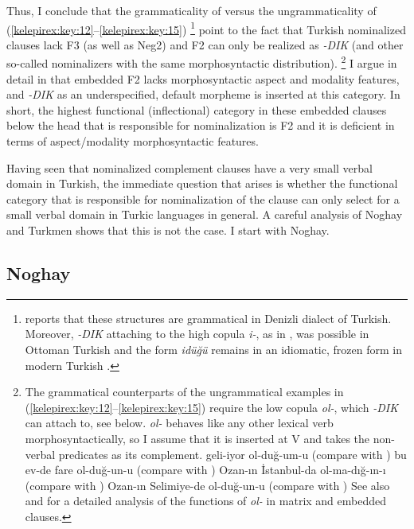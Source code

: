 \documentclass[output=paper]{langsci/langscibook}
\begin{document}
Thus, I conclude that the grammaticality of  versus the ungrammaticality of (\ref{kelepirex:key:12}--\ref{kelepirex:key:15})%
\footnote{%
    \citet{Sag2013} reports that these structures are grammatical in Denizli dialect of Turkish. 
    Moreover, \textit{-DIK} attaching to the high copula \textit{i-}, as in , 
    was possible in Ottoman Turkish \citep[195]{Kerslake1988} 
    and the form \textit{idüğü} remains in an idiomatic, frozen form in modern Turkish \citep{Banguoglu1990,Kelepir2013}.
} 
point to the fact that Turkish nominalized clauses lack F3 (as well as Neg2) and F2 can only be realized as \textit{-DIK} 
(and other so-called nominalizers with the same morphosyntactic distribution).%
\footnote{%
    The grammatical counterparts of the ungrammatical examples in (\ref{kelepirex:key:12}--\ref{kelepirex:key:15}) require the low copula \textit{ol-}, 
    which \textit{-DIK} can attach to, see  below. 
    \textit{ol-} behaves like any other lexical verb morphosyntactically, so I assume that it is inserted at V 
    and takes the non-verbal predicates as its complement.
    \ea
        \label{kelepirex:key:i:ftn11}
        \ea geli-iyor ol-duğ-um-u (compare with )  
        \ex bu ev-de fare ol-duğ-un-u (compare with )
        \ex Ozan-ın İstanbul-da ol-ma-dığ-ın-ı (compare with )
        \ex Ozan-ın Selimiye-de ol-duğ-un-u (compare with )
        \z 
    \z 
    See also \citet{Kerslake1988} and \citet{Goksel2001} for a detailed analysis of the functions of \textit{ol-} in matrix and embedded clauses.
} 
I argue in detail in \citet{Kelepir2013} that embedded F2 lacks morphosyntactic aspect and modality features, 
and \textit{-DIK} as an underspecified, default morpheme is inserted at this category. 
In short, the highest functional (inflectional) category in these embedded clauses below the head 
that is responsible for nominalization is F2 and it is deficient in terms of aspect/modality morphosyntactic features.

Having seen that nominalized complement clauses have a very small verbal domain in Turkish, 
the immediate question that arises is whether the functional category that is responsible for nominalization of the clause 
can only select for a small verbal domain in Turkic languages in general. 
A careful analysis of Noghay and Turkmen shows that this is not the case. 
I start with Noghay.

\subsection{Noghay} 
\label{kelepirsec:key:2.3}
\end{document}
